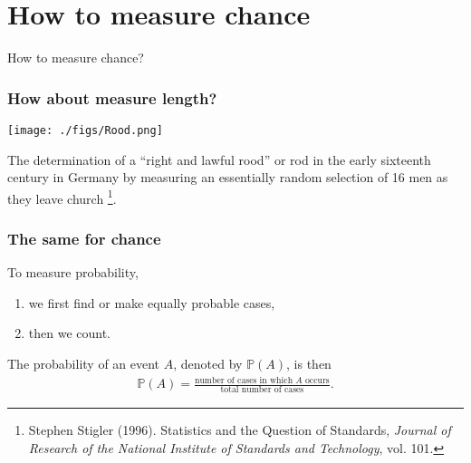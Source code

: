 \documentclass[9pt,xcolor=dvipsnames,table]{beamer}
\begin{document}
\section{How to measure chance}%
\begin{frame}[fragile] %
 \begin{center}
  \huge
  How to measure chance?
 \end{center}
\end{frame}
\begin{frame}[fragile,t] %
  \frametitle{How about measure length?}
  \begin{center}
    \texttt{[image: ./figs/Rood.png]}
    \bigskip

    The determination of a ``right and lawful rood'' or rod in the early sixteenth century in
    Germany by measuring an essentially random selection of 16 men as they leave church
    \footnote{Stephen Stigler (1996). Statistics and the Question of Standards, {\em Journal of Research of
    the National Institute of Standards and Technology}, vol. 101.}.
  \end{center}
\end{frame}
\begin{frame}[fragile] %
  \frametitle{The same for chance}

  To measure probability, \pause
  \begin{enumerate}
    \item we first find or make equally probable cases,
    \item then we count.
  \end{enumerate}
  \bigskip \vfill \pause

  The probability of an event $A$, denoted by $\mathbb{P}(A)$, is then
  \begin{align*}
    \mathbb{P}(A) = \frac{\text{number of cases in which $A$ occurs}}{\text{total number of cases}}.
  \end{align*}

\end{frame}
\end{document}
